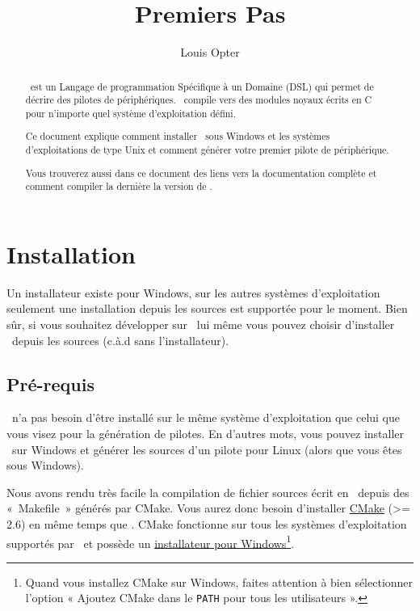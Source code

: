 \documentclass[francais]{rtxarticle}
\title{Premiers Pas}
\author{Louis Opter}
\begin{document}
\maketitle

\begin{abstract}
\rtx\ est un Langage de programmation Spécifique à un Domaine (DSL) qui permet
de décrire des pilotes de périphériques. \rtx\ compile vers des modules noyaux
écrits en C pour n'importe quel système d'exploitation défini.

Ce document explique comment installer \rtx\ sous Windows et les systèmes
d'exploitations de type Unix et comment générer votre premier pilote de
périphérique.

Vous trouverez aussi dans ce document des liens vers la documentation complète
et comment compiler la dernière la version de \rtx.
\end{abstract}

\tableofcontents

\pagebreak

\section{Installation}

Un installateur existe pour Windows, sur les autres systèmes d'exploitation
seulement une installation depuis les sources est supportée pour le moment.
Bien sûr, si vous souhaitez développer sur \rtx\ lui même vous pouvez choisir
d'installer \rtx\ depuis les sources (c.à.d sans l'installateur).

\subsection{Pré-requis}

\rtx\ n'a pas besoin d'être installé sur le même système d'exploitation que
celui que vous visez pour la génération de pilotes. En d'autres mots, vous
pouvez installer \rtx\ sur Windows et générer les sources d'un pilote pour Linux
(alors que vous êtes sous Windows).

Nous avons rendu très facile la compilation de fichier sources écrit en \rtx\
depuis des «~Makefile~» générés par CMake. Vous aurez donc besoin d'installer
\href{http://www.cmake.org/}{CMake} (>= 2.6) en même temps que \rtx. CMake
fonctionne sur tous les systèmes d'exploitation supportés par \rtx\ et possède
un \href{http://www.cmake.org/cmake/resources/software.html}{installateur pour
Windows}\footnote{Quand vous installez CMake sur Windows, faites attention à
bien sélectionner l'option « Ajoutez CMake dans le \texttt{PATH} pour tous les
utilisateurs ».}.
\end{document}
